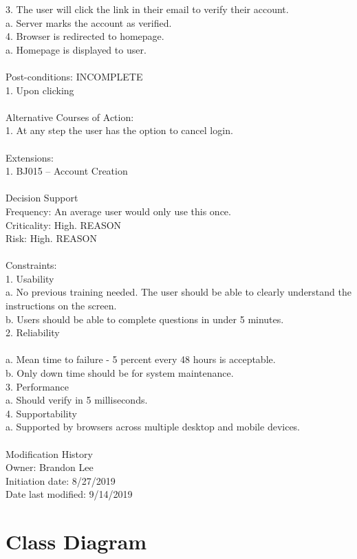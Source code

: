 \documentclass{report}
\begin{document}
3.	The user will click the link in their email to verify their account.\\
a.	Server marks the account as verified.\\
4.	Browser is redirected to homepage.\\
a.	Homepage is displayed to user.\\
\\
Post-conditions: INCOMPLETE \\
1.	Upon clicking \\
\\
Alternative Courses of Action:\\
1.	At any step the user has the option to cancel login.\\
\\
Extensions: \\
1.	BJ015 – Account Creation\\
\\
Decision Support\\
     Frequency: An average user would only use this once.\\
     Criticality: High. REASON\\
     Risk: High. REASON\\
\\
Constraints:\\
1.	Usability\\
	a.	No previous training needed. The user should be able to clearly understand the instructions on the screen.\\
	b.	Users should be able to complete questions in under 5 minutes.\\
2.	Reliability\\
\\	a.	Mean time to failure - 5 percent every 48 hours is acceptable.
\\	b.	Only down time should be for system maintenance.\\
3.	Performance\\
	a.	Should verify in 5 milliseconds.\\
4.	Supportability\\
	a.	Supported by browsers across multiple desktop and mobile devices.\\
\\
Modification History\\
     Owner: Brandon Lee\\
     Initiation date: 8/27/2019\\
     Date last modified: 9/14/2019\\
\chapter{Class Diagram}
\end{document}

